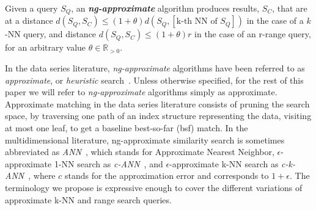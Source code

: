 \begin{defn} \label{def:appmatch}
Given a query $S_Q$, an \textit{\textbf{ng-approximate}} algorithm produces results, $S_C$, that are at a distance $d(S_Q,S_C) \leq (1+\theta)d(S_Q,[\text{k-th NN of }S_Q])$ in the case of a $k$-NN query, and distance $d(S_Q,S_C) \leq (1+\theta)r$ in the case of an r-range query, for an arbitrary value $\theta \in \mathbb{R}_{>0}$.
\end{defn}

In the data series literature, \textit{ng-approximate} algorithms have been referred to as \emph{approximate}, or \emph{heuristic} search~\cite{journal/kais/Camerra2014,journal/vldb/Zoumpatianos2016,journal/edbt/Schafer2012,conf/vldb/Wang2013,dpisax,ulisse}.
Unless otherwise specified, for the rest of this paper we will refer to \textit{ng-approximate} algorithms simply as approximate. Approximate matching in the data series literature
consists of pruning the search space, by traversing one path of an index structure representing the data, visiting at most one leaf, to get a baseline best-so-far (bsf) match.
{\color{blue} In the multidimensional literature, ng-approximate similarity search is sometimes abbreviated as \textit{ANN}~\cite{journal/tpami/jegou2011}, which stands for Approximate Nearest Neighbor, $\epsilon$-approximate 1-NN search as \textit{c-ANN}~\cite{conf/vldb/sun14}, and $\epsilon$-approximate k-NN search as \textit{c-k-ANN}~\cite{journal/pvldb/huang2015}, where $c$ stands for the approximation error and corresponds to $1+\epsilon$.} {\color{blue} The terminology we propose is expressive enough to cover the different variations of approximate k-NN and range search queries.}


